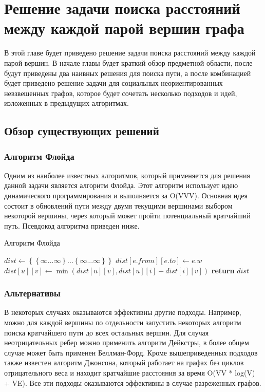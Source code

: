 \chapter{Решение задачи поиска расстояний между каждой парой вершин графа}

В этой главе будет приведено решение задачи поиска расстояний между каждой парой вершин. В начале главы будет краткий обзор предметной области, после будут приведены два наивных решения для поиска пути, а после комбинацией будет приведено решение задачи для социальных неориентированных невзвешенных графов, которое будет сочетать несколько подходов и идей, изложенных в предыдущих алгоритмах. 

\FloatBarrier
\section{Обзор существующих решений}

\subsection{Алгоритм Флойда}
Одним из наиболее известных алгоритмов, который применяется для решения данной задачи является алгоритм Флойда. Этот алгоритм использует идею динамического программирования и выполняется за O(VVV). Основная идея состоит в обновлений пути между двумя текущими вершинами выбором некоторой вершины, через который может пройти потенциальный кратчайший путь. Псевдокод алгоритма приведен ниже. 

\FloatBarrier
\begin{algorithm}
\caption{Алгоритм Флойда}\label{floyd}
\begin{algorithmic}[1]
\State $dist\gets \left\{ {   \left\{ {\infty ... \infty}\right\}  ... \left\{ {\infty ... \infty}\right\} }\right\}$
	\State $dist[e.from][e.to] \gets e.w$
\EndFor 
\State
{}
			\State $dist[u][v] \gets \min(dist[u][v], dist[u][i] + dist[i][v])$
		\EndFor
	\EndFor
\EndFor
\State \textbf{return} $dist$
\EndProcedure
\end{algorithmic}
\end{algorithm}

\FloatBarrier
\subsection{Альтернативы}
В некоторых случаях оказываются эффективны другие подходы. Например, можно для каждой вершины по отдельности запустить некоторых алгоритм поиска кратчайшего пути до всех остальных вершин. Для случая неотрицательных ребер можно применить алгоритм Дейкстры, в более общем случае может быть применен Беллман-Форд. Кроме вышеприведенных подходов также известен алгоритм Джонсона, который работает на графах без циклов отрицательного веса и находит кратчайшие расстояния за время O(VV * log(V) + VE). Все эти подходы оказываются эффективны в случае разреженных графов.

